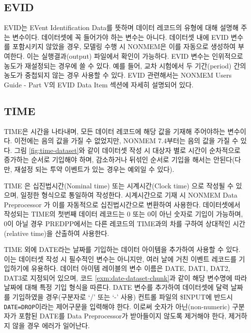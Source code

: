 \documentclass[
  10pt,
  krantz2,
  a4paper]{krantz}
\theoremstyle{definition}
\theoremstyle{definition}
\theoremstyle{definition}
\theoremstyle{remark}
\begin{document}
\hypertarget{evid}{%
\subsection{EVID}\label{evid}}

EVID는 EVent Identification Data를 뜻하며 데이터 레코드의 유형에 대해 설명해 주는 변수이다. 데이터셋에 꼭 들어가야 하는 변수는 아니다. 데이터셋 내에 EVID 변수를 포함시키지 않았을 경우, 모델링 수행 시 NONMEM은 이를 자동으로 생성하여 부여한다. 이는 실행결과(output) 파일에서 확인이 가능하다. EVID 변수는 인위적으로 농도가 재설정되는 경우에 쓸 수 있다. 예를 들어, 교차 시험에서 두 기간(period) 간의 농도가 중첩되지 않는 경우 사용할 수 있다. EVID 관련해서는 NONMEM Users Guide - Part V의 EVID Data Item 섹션에 자세히 설명되어 있다.

\hypertarget{time}{%
\subsection{TIME}\label{time}}

TIME은 시간을 나타내며, 모든 데이터 레코드에 해당 값을 기재해 주어야하는 변수이다. 이전에는 음의 값을 가질 수 없었지만, NONMEM 7.4부터는 음의 값을 가질 수 있다. 그림 \ref{fig:time-dataset}와 같이 데이터셋 작성 시 대상자 별로 시간이 순차적으로 증가하는 순서로 기입해야 하며, 감소하거나 뒤섞인 순서로 기입을 해서는 안된다(다만, 재설정 되는 투약 이벤트가 있는 경우는 예외일 수 있다).

TIME 은 십진법시간(Nominal time) 또는 시계시간(Clock time) 으로 작성될 수 있으며, 일정한 형식으로 통일하여 작성한다. 시계시간으로 기재 시 NONMEM Data Preprocessor 가 이를 자동적으로 십진법시간으로 변환하여 사용한다. 데이터셋에서 작성되는 TIME의 첫번째 데이터 레코드는 0 또는 0이 아닌 숫자로 기입이 가능하며, 0이 아닐 경우 PREDPP에서는 다른 레코드의 TIME과의 차를 구하여 상대적인 시간(relative time)을 산출하여 사용한다.

TIME 외에 DATE라는 날짜를 기입하는 데이터 아이템을 추가하여 사용할 수 있다. 이는 데이터셋 작성 시 필수적인 변수는 아니지만, 여러 날에 거친 이벤트 레코드를 기입하기에 유용하다. 데이터 아이템 레이블의 변수 이름은 DATE, DAT1, DAT2, DAT3로 지정되어 있으며, 코드 \ref{exm:date-dataset-chunk}과 같이 해당 변수명에 따라 날짜에 대해 특정 기입 형식을 따른다. DATE 변수를 추가하여 데이터셋에 달력 날짜를 기입하였을 경우(구분자로 `/' 또는 `-' 사용) 컨트롤 파일의 \$INPUT에 반드시 \texttt{DATE=DROP}이라는 제어구문을 입력해야 한다. 이로써 숫자가 아닌(non-numeric) 구분자가 포함된 DATE를 Data Preprocessor가 받아들이지 않도록 제거해야 한다, 제거하지 않을 경우 에러가 일어난다.
\end{document}
